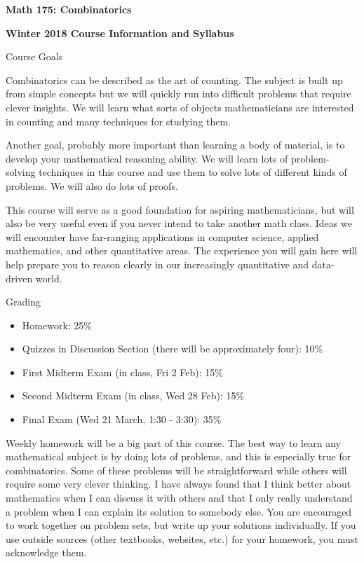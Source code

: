 \documentclass[11pt]{article}
\begin{document}
\begin{center}
{\Large \bf Math 175: Combinatorics} \\

\vspace{3mm}

\bf Winter 2018 Course Information and Syllabus\\
\vspace{3mm}
\end{center}

\vspace{3mm}

{\Large \centerline{Course Goals}}
Combinatorics can be described as the art of counting.  The subject is built up from simple concepts but we will quickly run into difficult problems that require clever insights.  We will learn what sorts of objects mathematicians are interested in counting and many techniques for studying them.

Another goal, probably more important than learning a body of material, is to develop your mathematical reasoning ability.  We will learn lots of problem-solving techniques in this course and use them to solve lots of different kinds of problems.  We will also do lots of proofs.

This course will serve as a good foundation for aspiring mathematicians, but will also be very useful even if you never intend to take another math class.  Ideas we will encounter  have far-ranging applications in computer science, applied mathematics, and other quantitative areas.  The experience you will gain here will help prepare you to reason clearly in our increasingly quantitative and data-driven world.

{\Large \centerline{Grading}}
\begin{itemize}
\item Homework: 25\%
\item Quizzes in Discussion Section (there will be approximately four): 10\%
\item First Midterm Exam (in class, Fri 2 Feb): 15\%
\item Second Midterm Exam (in class, Wed 28 Feb): 15\%
\item Final Exam (Wed 21 March, 1:30 - 3:30): 35\%
\end{itemize}

Weekly homework will be a big part of this course.  The best way to learn any mathematical subject is by doing lots of problems, and this is especially true for combinatorics.  Some of these problems will be straightforward while others will require some very clever thinking.  I have always found that I think better about mathematics when I can discuss it with others and that I only really understand a problem when I can explain its solution to somebody else.  You are encouraged to work together on problem sets, but write up your solutions individually.  If you use outside sources (other textbooks, websites, etc.) for your homework, you must acknowledge them.
\end{document}
